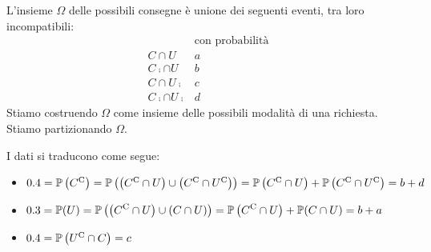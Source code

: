 L'insieme $\Omega $ delle possibili consegne è unione dei seguenti eventi, tra loro incompatibili:
\[
	\begin{array}{lc}
			& \text{con probabilità}\\
		C\cap U & a\\
		C\comp \cap U & b\\
		C\cap U\comp & c\\
		C\comp \cap U\comp & d
	\end{array}
\]
Stiamo costruendo $\Omega $ come insieme delle possibili modalità di una richiesta. Stiamo partizionando $\Omega $.




I dati si traducono come segue:
\begin{itemize}
\item $0.4=\mathbb{P}\left( C^{\mathrm{C}}\right) =\mathbb{P}\left(\left( C^{\mathrm{C}} \cap U\right) \cup \left( C^{\mathrm{C}} \cap U^{\mathrm{C}}\right)\right)
 =\mathbb{P}\left( C^{\mathrm{C}} \cap U\right) +\mathbb{P}\left( C^{\mathrm{C}} \cap U^{\mathrm{C}}\right)
 =b+d$
\item $\begin{aligned}[t]
0.3=\mathbb{P}( U) =\mathbb{P}\left(\left( C^{\mathrm{C}} \cap U\right) \cup ( C\cap U)\right)
 =\mathbb{P}\left( C^{\mathrm{C}} \cap U\right) +\mathbb{P}( C\cap U)
 =b+a
\end{aligned}$
\item $0.4=\mathbb{P}\left( U^{\mathrm{C}} \cap C\right) =c$
\end{itemize}

